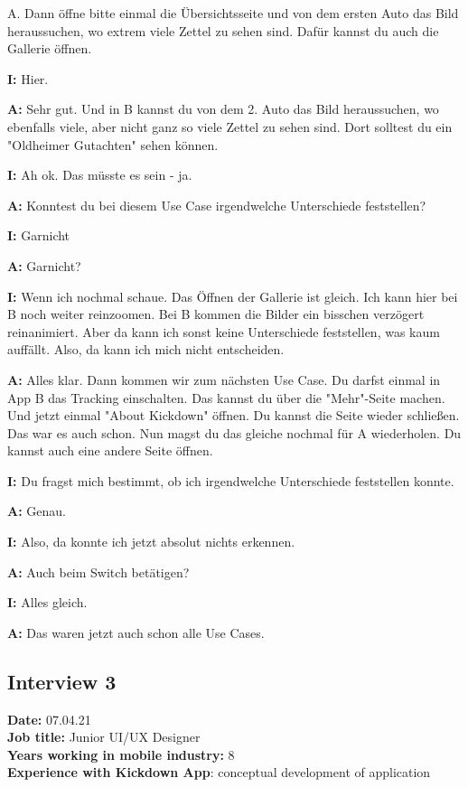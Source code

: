 \begin{myparindent}{0pt}
A. Dann öffne bitte einmal die Übersichtsseite und von dem ersten Auto das Bild heraussuchen, wo extrem viele Zettel zu sehen sind. Dafür kannst du auch die Gallerie öffnen.

\textbf{I:} Hier. 

\textbf{A:} Sehr gut. Und in B kannst du von dem 2. Auto das Bild heraussuchen, wo ebenfalls viele, aber nicht ganz so viele Zettel zu sehen sind. Dort solltest du ein "Oldheimer Gutachten" sehen können.

\textbf{I:} Ah ok. Das müsste es sein - ja. 

\textbf{A:} Konntest du bei diesem Use Case irgendwelche Unterschiede feststellen?

\textbf{I:} Garnicht

\textbf{A:} Garnicht?

\textbf{I:} Wenn ich nochmal schaue. Das Öffnen der Gallerie ist gleich. Ich kann hier bei B noch weiter reinzoomen. Bei B kommen die Bilder ein bisschen verzögert reinanimiert. Aber da kann ich sonst keine Unterschiede feststellen, was kaum auffällt. Also, da kann ich mich nicht entscheiden.

\textbf{A:} Alles klar. Dann kommen wir zum nächsten Use Case. Du darfst einmal in App B das Tracking einschalten. Das kannst du über die "Mehr"-Seite machen. Und jetzt einmal "About Kickdown" öffnen. Du kannst die Seite wieder schließen. Das war es auch schon. Nun magst du das gleiche nochmal für A wiederholen. Du kannst auch eine andere Seite öffnen.

\textbf{I:} Du fragst mich bestimmt, ob ich irgendwelche Unterschiede feststellen konnte.

\textbf{A:} Genau. 

\textbf{I:} Also, da konnte ich jetzt absolut nichts erkennen.

\textbf{A:} Auch beim Switch betätigen?

\textbf{I:} Alles gleich.

\textbf{A:} Das waren jetzt auch schon alle Use Cases.


\subsection{Interview 3}
\textbf{Date:} 07.04.21\\
\textbf{Job title:} Junior UI/UX Designer\\
\textbf{Years working in mobile industry:} 8\\
\textbf{Experience with Kickdown App}: conceptual development of application\\


\end{myparindent}
